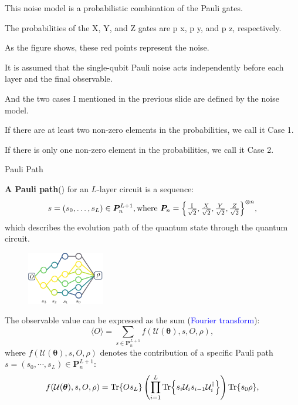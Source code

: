 \documentclass[10pt]{beamer}
\begin{document}
\begin{CJK}{UTF8}{gbsn}
{ This noise model is a probabilistic combination of the Pauli gates.

 The probabilities of the X, Y, and Z gates are p x, p y, and p z, respectively.


 As the figure shows, these red points represent the noise.

 It is assumed that the single-qubit Pauli noise acts independently before each layer and the final observable. 


 And the two cases I mentioned in the previous slide are defined by the noise model.

 If there are at least two non-zero elements in the probabilities, we call it Case 1.

 If there is only one non-zero element in the probabilities, we call it Case 2.
}




\begin{frame}[fragile]{Pauli Path}
  \begin{mdframed}
    \textbf{A Pauli path}(\cite{aharonov2022polynomial}) for an \(L\)-layer circuit is a sequence: 
    \vspace{-1em}
    \begin{equation}
    s = (s_0, \dots, s_L) \in \bm{P}_n^{L+1},
    \text{where } \bm{P}_n = \Bigl\{\tfrac{\mathbb{I}}{\sqrt{2}}, \tfrac{X}{\sqrt{2}}, \tfrac{Y}{\sqrt{2}}, \tfrac{Z}{\sqrt{2}}\Bigr\}^{\otimes n} ,
    \vspace{-1em}
  \end{equation}
    \small{which describes the evolution path of the quantum state through the quantum circuit.}
  \end{mdframed}
  \vspace{-1em}
  \begin{figure}
    \centering
    \includegraphics[width=0.3\textwidth]{fig/paulipath.pdf}
  \end{figure}
  \vspace{-1em}
 The observable value can be expressed as the sum (\textcolor{blue}{Fourier transform}):
  \begin{equation}
 \langle O \rangle=\sum_{s\in \bm{P}^{L+1}_n} f(\mathcal{U}(\bm{\theta}),s,O,\rho),
  \end{equation}
 where $f(\mathcal{U}(\bm{\theta}),s,O,\rho)$ denotes the contribution of a specific Pauli path $s=(s_0,\cdots,s_L)\in \bm{P}^{L+1}_n$:
 \vspace{-1em}
  \begin{equation}
 f(\mathcal{U}(\bm{\theta}),s,O,\rho)=\Tr{Os_L}\left(\prod_{i=1}^{L}\Tr{s_i\mathcal{U}_i s_{i-1}\mathcal{U}_i^\dagger}\right)\Tr{s_0\rho},
  \end{equation}
\end{frame}
\end{CJK}
\end{document}
